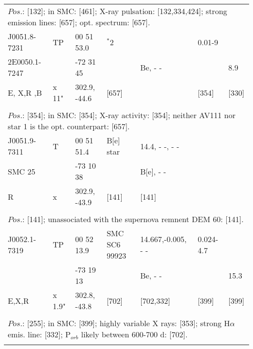 \documentclass{aa}
\begin{document}
\begin{table*}[h]
\begin{tabular}{p{2.5cm}p{1cm}p{1.8cm}p{2.3cm}p{3.3cm}p{2.0cm}p{2.2cm}}
 
\\
\multicolumn{7}{p{17.5cm}}{
$Pos$.: [132]; in SMC: [461]; X-ray pulsation: [132,334,424]; strong emission lines: [657]; opt. spectrum: [657]. }\\

\noalign{\smallskip}
\hline
\noalign{\smallskip}
J0051.8-7231       &    TP   & 00 51 53.0    & $^*$2            &               & 0.01-9        &            \\                       
2E0050.1-7247    &             &  -72 31 45     &                       &  Be, - -  &                    &  8.9    \\
E, X,R ,B               & x 11"  & 302.9, -44.6   &   [657]           &               &   [354]        &  [330]     \\
  
\\
\multicolumn{7}{p{17.5cm}}{
$Pos$.: [354]; in SMC: [354]; X-ray activity: [354]; neither AV111 nor star 1 is the opt. counterpart: [657].}\\

\noalign{\smallskip}
\hline
\noalign{\smallskip}
J0051.9-7311  &  T      &   00 51 51.4       & B[e] star    & 14.4, - -, - -    &        &      \\
 SMC 25           &           &      -73 10 38     &                      &  B[e], - -         &         &     \\
R                        &     x    & 302.9, -43.9       &   [141]         &   [141]            &         &      \\
  
\\
\multicolumn{7}{p{17.5cm}}{
$Pos$.: [141]; unassociated with the supernova remnent DEM 60: [141].}\\

\noalign{\smallskip}
\hline
\noalign{\smallskip}
J0052.1-7319  &  TP           & 00 52 13.9    & SMC SC6 99923        & 14.667,-0.005, - -  & 0.024-4.7     &              \\
                          &                   &  -73 19 13     &                                        &  Be, - -                     &                      & 15.3           \\
 E,X,R               &  x 1.9"      & 302.8, -43.8  &     [702]                          &  [702,332]              & [399]            & [399]  \\
  
\\
\multicolumn{7}{p{17.5cm}}{
$Pos$.: [255]; in SMC: [399]; highly variable X rays: [353]; strong H$\alpha$ emis. line: [332]; P$_{orb}$ likely 
between 600-700 d: [702].}\\
\noalign{\smallskip}


\end{tabular}
\end{table*}
\end{document}
